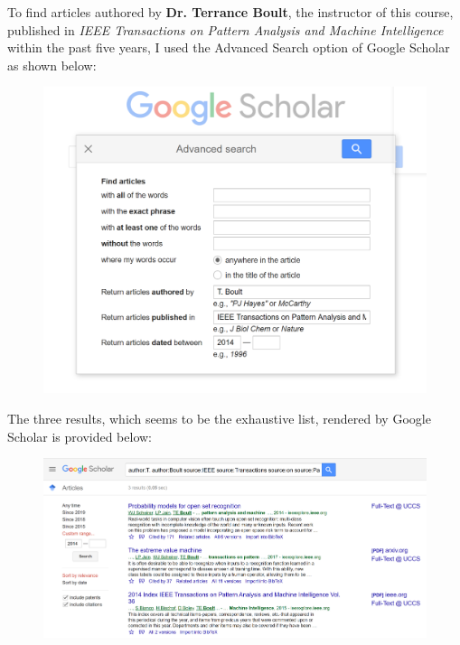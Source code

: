 \documentclass[journal]{IEEEtran}
\begin{document}
To find articles authored by \textbf{Dr. Terrance Boult}, the instructor of this course, published in \textit{IEEE Transactions on Pattern Analysis and Machine Intelligence} within the past five years, I used the Advanced Search option of Google Scholar as shown below:  

\begin{figure}[H]
	\begin{center}
		\includegraphics[width=0.9\linewidth]{images/fig4}
	\end{center}
	\captionsetup{labelformat=empty}
\end{figure}   

The three results, which seems to be the exhaustive list, rendered by Google Scholar is provided below:  

\begin{figure}[H]
	\begin{center}
		\includegraphics[width=0.9\linewidth]{images/fig5}
	\end{center}
	\captionsetup{labelformat=empty}
\end{figure}  
\end{document}
